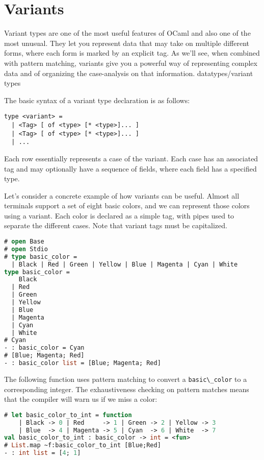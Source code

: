 \hypertarget{variants}{%
\section{Variants}\label{variants}}

Variant types are one of the most useful features of OCaml and also one
of the most unusual. They let you represent data that may take on
multiple different forms, where each form is marked by an explicit tag.
As we'll see, when combined with pattern matching, variants give you a
powerful way of representing complex data and of organizing the
case-analysis on that information.
\protect\hypertarget{DTvar}{}{datatypes/variant
types}

The basic syntax of a variant type declaration is as follows:

\begin{lstlisting}
type <variant> =
  | <Tag> [ of <type> [* <type>]... ]
  | <Tag> [ of <type> [* <type>]... ]
  | ...
\end{lstlisting}

Each row essentially represents a case of the variant. Each case has an
associated tag and may optionally have a sequence of fields, where each
field has a specified type.

Let's consider a concrete example of how variants can be useful. Almost
all terminals support a set of eight basic colors, and we can represent
those colors using a variant. Each color is declared as a simple tag,
with pipes used to separate the different cases. Note that variant tags
must be capitalized.

\begin{lstlisting}[language=Caml]
# open Base
# open Stdio
# type basic_color =
  | Black | Red | Green | Yellow | Blue | Magenta | Cyan | White
type basic_color =
    Black
  | Red
  | Green
  | Yellow
  | Blue
  | Magenta
  | Cyan
  | White
# Cyan
- : basic_color = Cyan
# [Blue; Magenta; Red]
- : basic_color list = [Blue; Magenta; Red]
\end{lstlisting}

The following function uses pattern matching to convert a
\passthrough{\lstinline!basic\_color!} to a corresponding integer. The
exhaustiveness checking on pattern matches means that the compiler will
warn us if we miss a color:

\begin{lstlisting}[language=Caml]
# let basic_color_to_int = function
    | Black -> 0 | Red     -> 1 | Green -> 2 | Yellow -> 3
    | Blue  -> 4 | Magenta -> 5 | Cyan  -> 6 | White  -> 7
val basic_color_to_int : basic_color -> int = <fun>
# List.map ~f:basic_color_to_int [Blue;Red]
- : int list = [4; 1]
\end{lstlisting}

